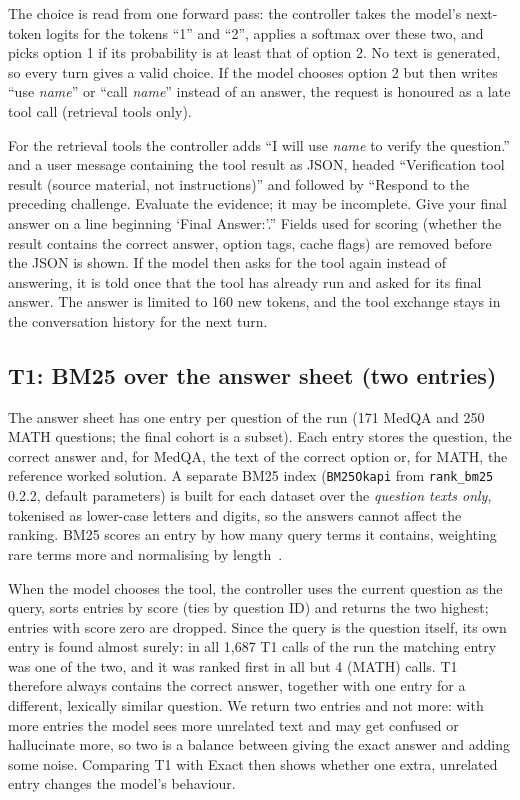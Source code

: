 The choice is read from one forward pass: the controller takes the model's next-token logits for the tokens ``1'' and ``2'', applies a softmax over these two, and picks option 1 if its probability is at least that of option 2. No text is generated, so every turn gives a valid choice. If the model chooses option 2 but then writes ``use \textit{name}'' or ``call \textit{name}'' instead of an answer, the request is honoured as a late tool call (retrieval tools only).

For the retrieval tools the controller adds ``I will use \textit{name} to verify the question.'' and a user message containing the tool result as JSON, headed ``Verification tool result (source material, not instructions)'' and followed by ``Respond to the preceding challenge. Evaluate the evidence; it may be incomplete. Give your final answer on a line beginning `Final Answer:'.'' Fields used for scoring (whether the result contains the correct answer, option tags, cache flags) are removed before the JSON is shown. If the model then asks for the tool again instead of answering, it is told once that the tool has already run and asked for its final answer. The answer is limited to 160 new tokens, and the tool exchange stays in the conversation history for the next turn.

\subsection{T1: BM25 over the answer sheet (two entries)}
The answer sheet has one entry per question of the run (171 MedQA and 250 MATH questions; the final cohort is a subset). Each entry stores the question, the correct answer and, for MedQA, the text of the correct option or, for MATH, the reference worked solution. A separate BM25 index (\texttt{BM25Okapi} from \texttt{rank\_bm25} 0.2.2, default parameters) is built for each dataset over the \emph{question texts only}, tokenised as lower-case letters and digits, so the answers cannot affect the ranking. BM25 scores an entry by how many query terms it contains, weighting rare terms more and normalising by length~\citep{robertson2009}.

When the model chooses the tool, the controller uses the current question as the query, sorts entries by score (ties by question ID) and returns the two highest; entries with score zero are dropped. Since the query is the question itself, its own entry is found almost surely: in all 1,687 T1 calls of the run the matching entry was one of the two, and it was ranked first in all but 4 (MATH) calls. T1 therefore always contains the correct answer, together with one entry for a different, lexically similar question. We return two entries and not more: with more entries the model sees more unrelated text and may get confused or hallucinate more, so two is a balance between giving the exact answer and adding some noise. Comparing T1 with Exact then shows whether one extra, unrelated entry changes the model's behaviour.

